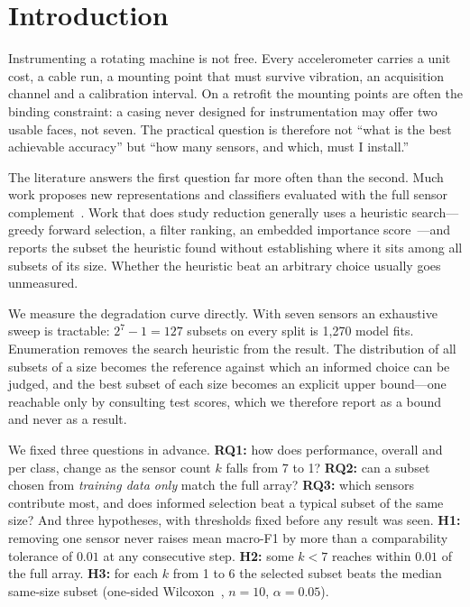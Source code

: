\documentclass[conference]{IEEEtran}
\begin{document}
\section{Introduction}

Instrumenting a rotating machine is not free. Every accelerometer carries a
unit cost, a cable run, a mounting point that must survive vibration, an
acquisition channel and a calibration interval. On a retrofit the mounting
points are often the binding constraint: a casing never designed for
instrumentation may offer two usable faces, not seven. The practical question
is therefore not ``what is the best achievable accuracy'' but ``how many
sensors, and which, must I install.''

The literature answers the first question far more often than the second. Much
work proposes new representations and classifiers evaluated with the full
sensor complement~\cite{lei2020}. Work that does study reduction generally uses
a heuristic search---greedy forward selection, a filter ranking, an embedded
importance score~\cite{guyon2003}---and reports the subset the heuristic found
without establishing where it sits among all subsets of its size. Whether the
heuristic beat an arbitrary choice usually goes unmeasured.

We measure the degradation curve directly. With seven sensors an exhaustive
sweep is tractable: $2^7-1=127$ subsets on every split is 1{,}270 model fits.
Enumeration removes the search heuristic from the result. The distribution of
all subsets of a size becomes the reference against which an informed choice
can be judged, and the best subset of each size becomes an explicit upper
bound---one reachable only by consulting test scores, which we therefore report
as a bound and never as a result.

We fixed three questions in advance. \textbf{RQ1:} how does performance, overall
and per class, change as the sensor count $k$ falls from 7 to 1?
\textbf{RQ2:} can a subset chosen from \emph{training data only} match the full
array? \textbf{RQ3:} which sensors contribute most, and does informed selection
beat a typical subset of the same size? And three hypotheses, with thresholds
fixed before any result was seen. \textbf{H1:} removing one sensor never raises
mean macro-F1 by more than a comparability tolerance of $0.01$ at any
consecutive step. \textbf{H2:} some $k<7$ reaches within $0.01$ of the full
array. \textbf{H3:} for each $k$ from 1 to 6 the selected subset beats the
median same-size subset (one-sided Wilcoxon~\cite{wilcoxon1945}, $n=10$,
$\alpha=0.05$).
\end{document}
